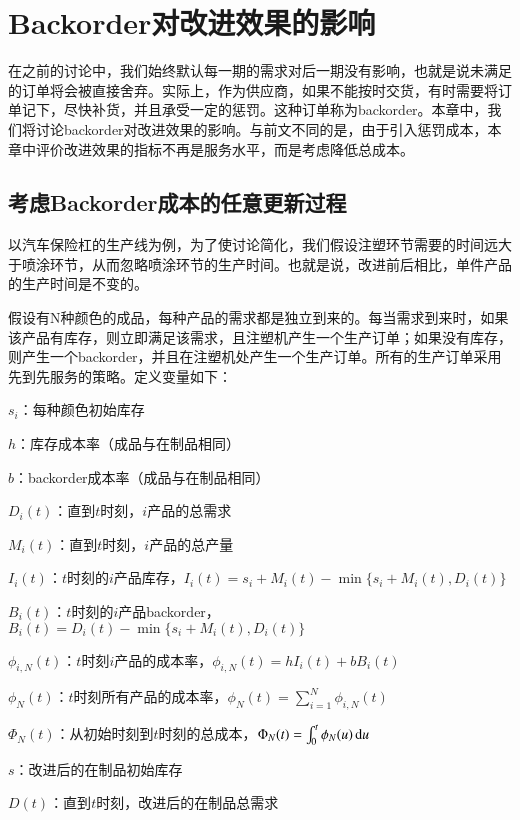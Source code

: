 
\chapter{Backorder对改进效果的影响}

在之前的讨论中，我们始终默认每一期的需求对后一期没有影响，也就是说未满足的订单将会被直接舍弃。实际上，作为供应商，如果不能按时交货，有时需要将订单记下，尽快补货，并且承受一定的惩罚。这种订单称为backorder。本章中，我们将讨论backorder对改进效果的影响。与前文不同的是，由于引入惩罚成本，本章中评价改进效果的指标不再是服务水平，而是考虑降低总成本。




\section{考虑Backorder成本的任意更新过程}

以汽车保险杠的生产线为例，为了使讨论简化，我们假设注塑环节需要的时间远大于喷涂环节，从而忽略喷涂环节的生产时间。也就是说，改进前后相比，单件产品的生产时间是不变的。

假设有N种颜色的成品，每种产品的需求都是独立到来的。每当需求到来时，如果该产品有库存，则立即满足该需求，且注塑机产生一个生产订单；如果没有库存，则产生一个backorder，并且在注塑机处产生一个生产订单。所有的生产订单采用先到先服务的策略。定义变量如下：

$s_i$：每种颜色初始库存

$h$：库存成本率（成品与在制品相同）

$b$：backorder成本率（成品与在制品相同）

$D_i(t)$：直到$t$时刻，$i$产品的总需求

$M_i(t)$：直到$t$时刻，$i$产品的总产量

$I_i(t)$：$t$时刻的$i$产品库存，$I_i(t)=s_i+M_i(t)-\min\{s_i+M_i(t),D_i(t)\}$

$B_i(t)$：$t$时刻的$i$产品backorder，$B_i(t)=D_i(t)-\min\{s_i+M_i(t),D_i(t)\}$

$\phi_{i,N}(t)$：$t$时刻$i$产品的成本率，$\phi_{i,N}(t)=hI_i(t)+bB_i(t)$

$\phi_N(t)$：$t$时刻所有产品的成本率，$\phi_N(t)=\sum_{i=1}^N\phi_{i,N}(t)$

$\Phi_N(t)$：从初始时刻到$t$时刻的总成本，$\Phi_N(t)=\int_0^t\phi_N(u)\operatorname{d\!} u$

$s$：改进后的在制品初始库存

$D(t)$：直到$t$时刻，改进后的在制品总需求

